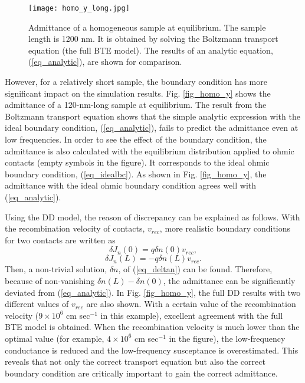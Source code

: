 \documentclass[journal]{IEEEtran}
\newcommand{\revision}[1]{{#1}}
\begin{document}
\begin{figure}[!t]
\centering
\texttt{[image: homo\_y\_long.jpg]}
\caption{\revision{Admittance of a homogeneous sample at equilibrium.
The sample length is 1200 nm.
It is obtained by solving the Boltzmann transport equation (the full BTE model).
The results of an analytic equation, (\ref{eq_analytic}), are shown for comparison.}}
\label{fig_homo_y_long}
\end{figure} 
  
\revision{However, for a relatively short sample, the boundary condition has more significant impact on the simulation results. 
   Fig. \ref{fig_homo_y} shows the admittance of a 120-nm-long sample at equilibrium.
   The result from the Boltzmann transport equation shows that the simple analytic expression with the ideal boundary condition, (\ref{eq_analytic}), fails to predict the admittance even at low frequencies.
   In order to see the effect of the boundary condition, the admittance is also calculated with the equilibrium distribution applied to ohmic contacts (empty symbols in the figure).
   It corresponds to the ideal ohmic boundary condition, (\ref{eq_idealbc}).
   As shown in Fig. \ref{fig_homo_y}, the admittance with the ideal ohmic boundary condition agrees well with (\ref{eq_analytic}).}

\revision{Using the DD model, the reason of discrepancy can be explained as follows.
   With the recombination velocity of contacts, $v_{rec}$, more realistic boundary conditions for two contacts are written as 
\begin{equation}
\delta J_n(0)= q \delta n(0) v_{rec},
\end{equation}
\begin{equation}
\delta J_n(L)= -q \delta n(L) v_{rec}.
\end{equation}
   Then, a non-trivial solution, $\delta n$, of (\ref{eq_deltan}) can be found.
   Therefore, because of non-vanishing $\delta n(L) - \delta n(0)$, the admittance can be significantly deviated from (\ref{eq_analytic}).
   In Fig. \ref{fig_homo_y}, the full DD results with two different values of $v_{rec}$ are also shown.
   With a certain value of the recombination velocity ($9\times10^{6}$ cm sec$^{-1}$ in this example), excellent agreement with the full BTE model is obtained.
   When the recombination velocity is much lower than the optimal value (for example, $4\times10^{6}$ cm sec$^{-1}$ in the figure), the low-frequency conductance is reduced and the low-frequency susceptance is overestimated.}
   This reveals that not only the correct transport equation but also the correct boundary condition are critically important to gain the correct admittance.
   
\end{document}
